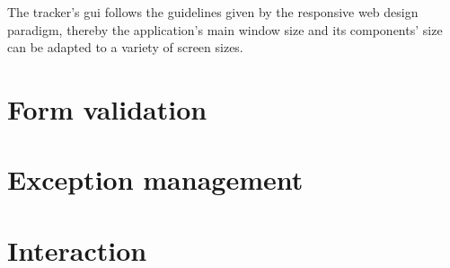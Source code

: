 \documentclass[twoside,a4paper,10pt]{article}
\begin{document}
The tracker's gui follows the guidelines given by the responsive web design
paradigm, thereby the application's main window size and its components' size
can be adapted to a variety of screen sizes.

\section{Form validation}

\section{Exception management}

\section{Interaction}

%
%
\end{document}
